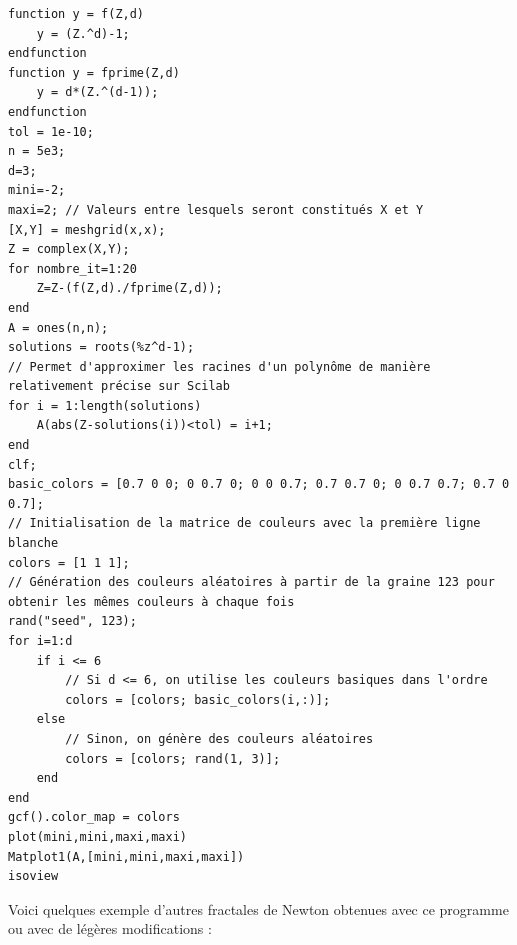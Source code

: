             \begin{center}
                \begin{verbatim}
function y = f(Z,d)
    y = (Z.^d)-1;
endfunction
function y = fprime(Z,d)
    y = d*(Z.^(d-1));
endfunction
tol = 1e-10;
n = 5e3;
d=3;
mini=-2;
maxi=2; // Valeurs entre lesquels seront constitués X et Y
[X,Y] = meshgrid(x,x);
Z = complex(X,Y);
for nombre_it=1:20
    Z=Z-(f(Z,d)./fprime(Z,d));
end
A = ones(n,n);
solutions = roots(%z^d-1);
// Permet d'approximer les racines d'un polynôme de manière relativement précise sur Scilab
for i = 1:length(solutions)
    A(abs(Z-solutions(i))<tol) = i+1;
end
clf;
basic_colors = [0.7 0 0; 0 0.7 0; 0 0 0.7; 0.7 0.7 0; 0 0.7 0.7; 0.7 0 0.7];
// Initialisation de la matrice de couleurs avec la première ligne blanche
colors = [1 1 1];
// Génération des couleurs aléatoires à partir de la graine 123 pour obtenir les mêmes couleurs à chaque fois
rand("seed", 123);
for i=1:d
    if i <= 6
        // Si d <= 6, on utilise les couleurs basiques dans l'ordre
        colors = [colors; basic_colors(i,:)];
    else
        // Sinon, on génère des couleurs aléatoires
        colors = [colors; rand(1, 3)];
    end
end
gcf().color_map = colors
plot(mini,mini,maxi,maxi)
Matplot1(A,[mini,mini,maxi,maxi])
isoview
                \end{verbatim}
               \label{lst:code_3}
            \end{center}
            Voici quelques exemple d'autres fractales de Newton obtenues avec ce programme ou avec de légères modifications : 
